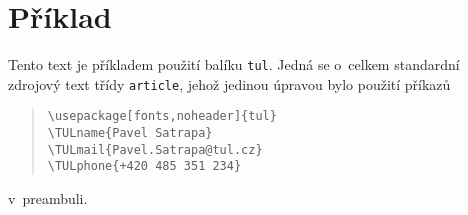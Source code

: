\documentclass[a4paper,12pt,twoside,FP]{article}
\newcommand{\cmdfont}[1]{\texttt{\color{\tulcolor}#1}}
\newcommand{\cmdnoindex}[1]{\cmdfont{\textbackslash #1}}
\begin{document}
\section{Příklad}

Tento text je příkladem použití balíku \cmdfont{tul}. Jedná se o~celkem
standardní zdrojový text třídy \cmdfont{article}, jehož jedinou úpravou bylo
použití příkazů

\begin{quote}
\cmdnoindex{usepackage[fonts,noheader]\{tul\}}\\
\cmdnoindex{TULname\{Pavel Satrapa\}}\\
\cmdnoindex{TULmail\{Pavel.Satrapa@tul.cz\}}\\
\cmdnoindex{TULphone\{+420\,485\,351\,234\}}
\end{quote}

v~preambuli.


\renewcommand{\indexname}{Přehled příkazů}
\printindex
\end{document}
